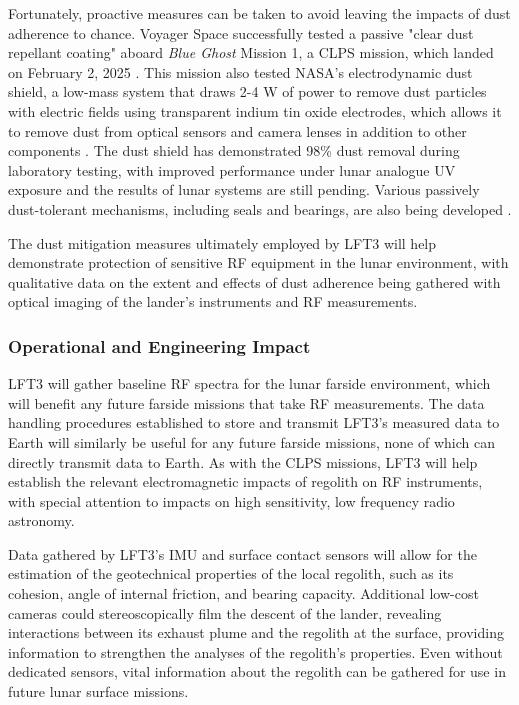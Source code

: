 Fortunately, proactive measures can be taken to avoid leaving the impacts of dust adherence to chance.  Voyager Space successfully tested a passive "clear dust repellant coating" aboard \textit{Blue Ghost} Mission 1, a CLPS mission, which landed on February 2, 2025 \citep{voyager2025dustcoating}.  This mission also tested NASA's electrodynamic dust shield, a low-mass system that draws 2-4 W of power to remove dust particles with electric fields using transparent indium tin oxide electrodes, which allows it to remove dust from optical sensors and camera lenses in addition to other components \citep{buhler2020current}.  The dust shield has demonstrated 98\% dust removal during laboratory testing, with improved performance under lunar analogue UV exposure \citep{WANG20246194} and the results of lunar systems are still pending.  Various passively dust-tolerant mechanisms, including seals and bearings, are also being developed \citep{fritz2024dustroadmap}.

The dust mitigation measures ultimately employed by LFT3 will help demonstrate protection of sensitive RF equipment in the lunar environment, with qualitative data on the extent and effects of dust adherence being gathered with optical imaging of the lander's instruments and RF measurements.

\subsubsection{Operational and Engineering Impact}

LFT3 will gather baseline RF spectra for the lunar farside environment, which will benefit any future farside missions that take RF measurements.  The data handling procedures established to store and transmit LFT3's measured data to Earth will similarly be useful for any future farside missions, none of which can directly transmit data to Earth.  As with the CLPS missions, LFT3 will help establish the relevant electromagnetic impacts of regolith on RF instruments, with special attention to impacts on high sensitivity, low frequency radio astronomy.

Data gathered by LFT3's IMU and surface contact sensors will allow for the estimation of the geotechnical properties of the local regolith, such as its cohesion, angle of internal friction, and bearing capacity.  Additional low-cost cameras could stereoscopically film the descent of the lander, revealing interactions between its exhaust plume and the regolith at the surface, providing information to strengthen the analyses of the regolith's properties.  Even without dedicated sensors, vital information about the regolith can be gathered for use in future lunar surface missions.


